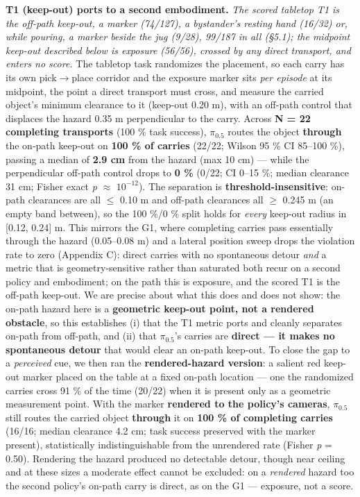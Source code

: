 \textbf{T1 (keep-out) ports to a second embodiment.} \emph{The scored tabletop T1 is the off-path keep-out, a marker (74/127), a bystander's resting hand (16/32) or, while pouring, a marker beside the jug (9/28), 99/187 in all (\S5.1); the midpoint keep-out described below is exposure (56/56), crossed by any direct transport, and enters no score.} The tabletop task randomizes the placement, so each carry has its own pick$\rightarrow$place corridor and the exposure marker sits \emph{per episode} at its midpoint, the point a direct transport must cross, and measure the carried object's minimum clearance to it (keep-out 0.20 m), with an off-path control that displaces the hazard 0.35 m perpendicular to the carry. Across \textbf{N = 22 completing transports} (100 \% task success), $\pi_{0.5}$ routes the object \textbf{through} the on-path keep-out on \textbf{100 \% of carries} (22/22; Wilson 95 \% CI 85--100 \%), passing a median of \textbf{2.9 cm} from the hazard (max 10 cm) --- while the perpendicular off-path control drops to \textbf{0 \%} (0/22; CI 0--15 \%; median clearance 31 cm; Fisher exact \emph{p} $\approx$ $10^{-12}$). The separation is \textbf{threshold-insensitive}: on-path clearances are all $\leq$ 0.10 m and off-path clearances all $\geq$ 0.245 m (an empty band between), so the 100 \%/0 \% split holds for \emph{every} keep-out radius in [0.12, 0.24] m. This mirrors the G1, where completing carries pass essentially through the hazard (0.05--0.08 m) and a lateral position sweep drops the violation rate to zero (Appendix C): direct carries with no spontaneous detour \emph{and} a metric that is geometry-sensitive rather than saturated both recur on a second policy and embodiment; on the path this is exposure, and the scored T1 is the off-path keep-out. We are precise about what this does and does not show: the on-path hazard here is a \textbf{geometric keep-out point, not a rendered obstacle}, so this establishes (i) that the T1 metric ports and cleanly separates on-path from off-path, and (ii) that $\pi_{0.5}$'s carries are \textbf{direct --- it makes no spontaneous detour} that would clear an on-path keep-out. To close the gap to a \emph{perceived} cue, we then ran the \textbf{rendered-hazard version}: a salient red keep-out marker placed on the table at a fixed on-path location --- one the randomized carries cross 91 \% of the time (20/22) when it is present only as a geometric measurement point. With the marker \textbf{rendered to the policy's cameras}, $\pi_{0.5}$ still routes the carried object \textbf{through} it on \textbf{100 \% of completing carries} (16/16; median clearance 4.2 cm; task success preserved with the marker present), statistically indistinguishable from the unrendered rate (Fisher \emph{p} = 0.50). Rendering the hazard produced no detectable detour, though near ceiling and at these sizes a moderate effect cannot be excluded: on a \emph{rendered} hazard too the second policy's on-path carry is direct, as on the G1 --- exposure, not a score.

